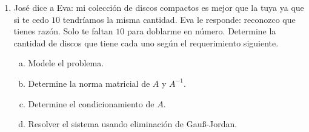 \documentclass[
	spanish,
	9pt,
	utf8,
	xcolor=table,
	handout,
	aspectratio=1610,
	professionalfonts,
	notheorems,
	mathserif,
]{beamer}
\newcounter{savedenum}
\newcommand*{\saveenum}{\setcounter{savedenum}{\theenumi}}
\begin{document}
\begin{frame}
\begin{enumerate}
\begin{multicols}{2}
\begin{enumerate}[a)]
				            Resolver el sistema usando eliminación de Gauß-Jordan.
			      \end{enumerate}
		      \end{multicols}

		\item
		      José dice a Eva: mi colección de discos compactos es mejor que la tuya ya que si te cedo $10$ tendríamos
		      la misma cantidad.
		      Eva le responde: reconozco que tienes razón.
		      Solo te faltan $10$ para doblarme en número.
		      Determine la cantidad de discos que tiene cada uno según el requerimiento siguiente.

		      \begin{multicols}{2}
			      \begin{enumerate}[a)]
				      \item

				            Modele el problema.

				      \item

				            Determine la norma matricial de $A$ y $A^{-1}$.

				      \item

				            Determine el condicionamiento de $A$.

				      \item

				            Resolver el sistema usando eliminación de Gauß-Jordan.
			      \end{enumerate}
		      \end{multicols}

		      \saveenum
	\end{enumerate}
\end{frame}
\end{document}
